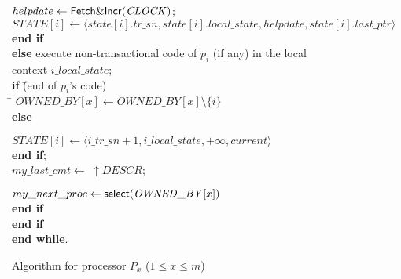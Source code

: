 \begin{figure}[h!]
{{\begin{minipage}[t]{150mm}
\begin{tabbing}
  \> \> \> \> \> 
    $helpdate \leftarrow   {\sf Fetch\&Incr}(\mathit{CLOCK})$;\\ 

  \> \> \> \> \> 
$\mathit{STATE}[i]\leftarrow 
    \langle   state[i].tr\_sn, state[i].local\_state, helpdate,
                         state[i].last\_ptr \rangle$\\

 \> \> \> \> {\bf end if} \\

 \> \> \>  
{\bf else} \>  execute non-transactional code of $p_i$ (if any) 
   in the local context  $i\_local\_state$;\\

 \> \> \> \>  
{\bf if} \= (end of $p_i$'s code)     \\


 \> \> \>\>  \= 
  $\mathit{OWNED\_BY}[x]\leftarrow    
           \mathit{OWNED\_BY}[x] \setminus \{i\}$\\


 \>\>\>\>\> {\bf else} \> 

   $\mathit{STATE}[i] \leftarrow 
      \langle i\_tr\_sn +1, i\_local\_state, +\infty, current \rangle$\\

 \>\>\>\>  {\bf end if};\\ 

 \>\>\>\> 
 $my\_last\_cmt \leftarrow   ~\uparrow \mathit{DESCR}$;

 $my\_next\_proc \leftarrow  {\sf select}(\mathit{OWNED\_BY}[x])$\\


 \> \>  {\bf end  if}\\

 \>   {\bf end if}\\ 


{\bf end while}.  %


\end{tabbing}
\normalsize
\end{minipage}
}
\caption{Algorithm for processor $P_x$ ($1 \leq x \leq m$)}
\label{fig:main-construction}
}
\end{figure}



